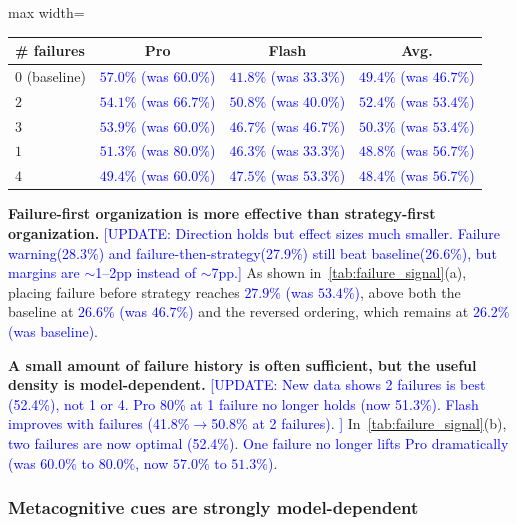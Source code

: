 \documentclass{article}
\newcommand{\blue}[1]{\textcolor{blue}{#1}}
\newcommand{\nbf}[1]{{\noindent \textbf{#1}}}
\begin{document}
\begin{table}[h]
\begin{minipage}[t]{0.48\textwidth}
\begin{adjustbox}{max width=\textwidth}
\begin{tabular}{lccc}
\toprule
\textbf{\# failures} & \textbf{Pro} & \textbf{Flash} & \textbf{Avg.} \\
\midrule
$0$ (baseline) & \blue{$57.0\%$ (was $60.0\%$)} & \blue{$41.8\%$ (was $33.3\%$)} & \blue{$49.4\%$ (was $46.7\%$)} \\
\cellcolor{bestRow}$2$ & \blue{$54.1\%$ (was $66.7\%$)} & \blue{$50.8\%$ (was $40.0\%$)} & \cellcolor{bestRow}\blue{$52.4\%$ (was $53.4\%$)} \\
$3$ & \blue{$53.9\%$ (was $60.0\%$)} & \blue{$46.7\%$ (was $46.7\%$)} & \blue{$50.3\%$ (was $53.4\%$)} \\
$1$ & \blue{$51.3\%$ (was $80.0\%$)} & \blue{$46.3\%$ (was $33.3\%$)} & \blue{$48.8\%$ (was $56.7\%$)} \\
$4$ & \blue{$49.4\%$ (was $60.0\%$)} & \blue{$47.5\%$ (was $53.3\%$)} & \blue{$48.4\%$ (was $56.7\%$)} \\
\bottomrule
\end{tabular}
\end{adjustbox}
\end{minipage}
\end{table}

\nbf{Failure-first organization is more effective than strategy-first organization.}
\blue{[UPDATE: Direction holds but effect sizes much smaller. Failure warning(28.3\%) and failure-then-strategy(27.9\%) still beat baseline(26.6\%), but margins are $\sim$1--2pp instead of $\sim$7pp.]}
As shown in~\cref{tab:failure_signal}(a), placing failure before strategy reaches \blue{$27.9\%$ (was $53.4\%$)}, above both the baseline at \blue{$26.6\%$ (was $46.7\%$)} and the reversed ordering, which remains at \blue{$26.2\%$ (was baseline)}.

\nbf{A small amount of failure history is often sufficient, but the useful density is model-dependent.}
\blue{[UPDATE: New data shows 2 failures is best (52.4\%), not 1 or 4. Pro 80\% at 1 failure no longer holds (now 51.3\%). Flash improves with failures (41.8\%$\to$50.8\% at 2 failures). ]}
In~\cref{tab:failure_signal}(b), \blue{two failures are now optimal (52.4\%)}. \blue{One failure no longer lifts Pro dramatically (was $60.0\%$ to $80.0\%$, now $57.0\%$ to $51.3\%$)}.


\subsubsection{Metacognitive cues are strongly model-dependent}
\end{document}
